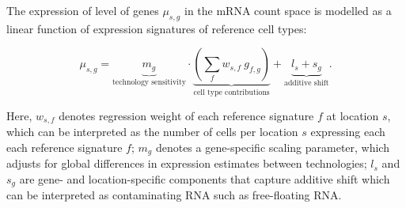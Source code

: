 \documentclass[11pt,a4paper]{article}
\begin{document}
The expression of level of genes $\mu_{s,g}$ in the mRNA count space is modelled as a linear function of expression signatures of reference cell types:
\begin{linenomath*} \begin{equation} \label{eq:c2l:3}
\mu_{s,g} = \underbrace{m_{g}}_{\text{technology sensitivity}} \cdot \underbrace{\left (\sum_{f} {w_{s,f} \: g_{f,g}} \right)}_{\text{cell type contributions}} +  \underbrace{l_s + s_{g}}_{\text{additive shift}}.
\end{equation} \end{linenomath*}

Here, $w_{s,f}$ denotes regression weight of each reference signature $f$ at location $s$, which can be interpreted as the number of cells per location $s$ expressing each each reference signature $f$; 
$m_{g}$ denotes a gene-specific scaling parameter, which adjusts for global differences in expression estimates between technologies;
$l_{s}$ and $s_{g}$ are gene- and location-specific components that capture additive shift which can be interpreted as contaminating RNA such as free-floating RNA. \\
\end{document}
